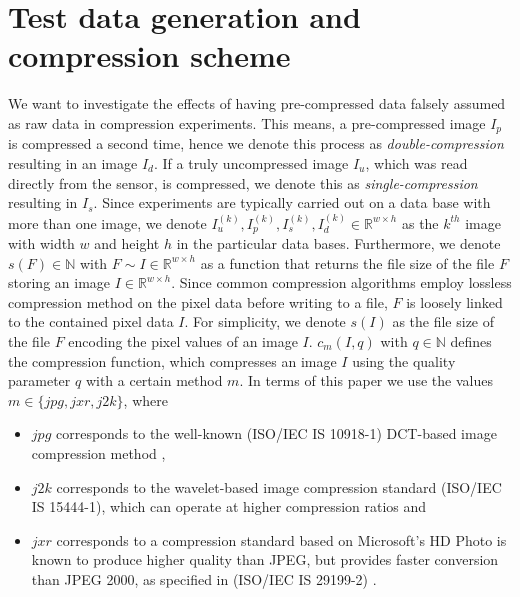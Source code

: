 \documentclass[10pt,twocolumn,letterpaper]{article}
\begin{document}
\section{Test data generation and compression scheme}
\label{section:comprScheme}
We want to investigate the effects of having pre-compressed data falsely assumed as raw data in compression experiments. This means, a pre-compressed image $I_p$ is compressed a second time, hence we denote this process as \emph{double-compression} resulting in an image $I_d$. If a truly uncompressed image $I_u$, which was read directly from the sensor, is compressed, we denote this as \emph{single-compression} resulting in $I_s$. Since experiments are typically carried out on a data base with more than one image, we denote $I_u^{(k)}, I_p^{(k)}, I_s^{(k)}, I_d^{(k)} \in \mathbb{R}^{w \times h}$ as the $k^{th}$ image with width $w$ and height $h$ in the particular data bases. Furthermore, we denote $s(F) \in \mathbb{N}$ with $F \sim{I \in \mathbb{R}^{w \times h}}$ as a function that returns the file size of the file $F$ storing an image $I \in \mathbb{R}^{w \times h} $. Since common compression algorithms employ lossless compression method on the pixel data before writing to a file, $F$ is loosely linked to the contained pixel data $I$. For simplicity, we denote $s(I)$ as the file size of the file $F$ encoding the pixel values of an image $I$. $c_{m}(I, q)$ with $q \in \mathbb{N}$ defines the compression function, which compresses an image $I$ using the quality parameter $q$ with a certain method $m$. In terms of this paper we use the values $m \in \{jpg, jxr, j2k\}$, where 
\begin{itemize}
	\item $jpg$ corresponds to the well-known (ISO/IEC IS 10918-1) DCT-based image compression method \cite{jpg},
	\item $j2k$ corresponds to the wavelet-based image compression standard (ISO/IEC IS 15444-1), which can operate at higher compression ratios \cite{j2k} and
	\item $jxr$ corresponds to a compression standard based on Microsoft’s HD Photo is known to produce higher quality than JPEG, but provides faster conversion than JPEG 2000, as specified in (ISO/IEC IS 29199-2) \cite{jxr}.  
\end{itemize}

\end{document}

